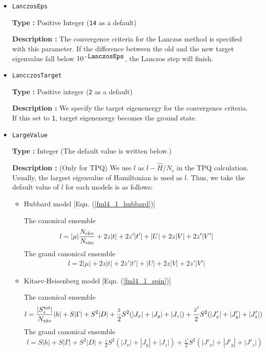\begin{itemize}
{\bf Description :}  We specify the number of getting eigenvectors from the ground energy by Lanczos method.\\
When exct=2, we obtain the eigenvector of the first-excited state.

{\bf Note}:  the following condition must be satisfied: \verb|nvec| $>=$ \verb|exct|.

\item \verb|LanczosEps|

{\bf Type :} Positive Integer (\verb|14| as a default)

{\bf Description :} The convergence criteria for the Lanczos method is specified with this parameter.
If the difference between the old and the new target eigenvalue fall below $10^{- \verb|LanczosEps|}$, 
the Lanczos step will finish.

\item \verb|LancczosTarget|

{\bf Type :} Positive integer (\verb|2| as a default)

{\bf Description :} We specify the target eigenenergy for the convergence criteria.
If this set to \verb|1|, target eigenenergy becomes the ground state.

\item \verb|LargeValue|

{\bf Type :} Integer (The default value is written below.)

{\bf Description :} (Only for TPQ) 
We use $l$ as $l-\hat{H}/N_{s}$ in the TPQ calculation.
Usually, the largest eigenvalue of Hamiltonian is used as $l$. 
Thus, we take the default value of $l$ for each models is as follows:

\begin{itemize}

\item Hubbard model [Eqn. (\ref{fml4_1_hubbard})]

The canonical ensemble
\begin{align}
l = |\mu| \frac{N_{\rm elec}}{N_{\rm site}}
+ 2 z |t| + 2 z' |t'| + |U| + 2 z |V| + 2 z' |V'| 
\end{align}
The grand canonical ensemble
\begin{align}
l = 2|\mu|
+ 2 z |t| + 2 z' |t'| + |U| + 2 z |V| + 2 z' |V'|
\end{align}

\item Kitaev-Heisenberg model [Eqn. (\ref{fml4_1_spin})]

The canonical ensemble
\begin{align}
l = \frac{|S_z^{\rm tot}|}{N_{\rm site}}|h| + S |\Gamma| + S^2 |D|
+\frac{z}{2} S^2 (|J_x|+|J_y|+|J_z|) +\frac{z'}{2} S^2 (|J'_x|+|J'_y|+|J'_z|)
\end{align}
The grand canonical ensemble
\begin{align}
l = S |h| + S |\Gamma| + S^2 |D|
+\frac{z}{2} S^2 (|J_x|+|J_y|+|J_z|) + \frac{z'}{2} S^2 (|J'_x|+|J'_y|+|J'_z|) 
\end{align}


\end{itemize}
\end{itemize}
